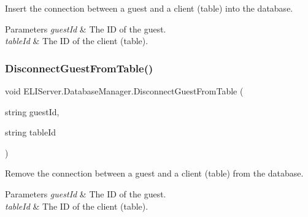 Insert the connection between a guest and a client (table) into the database. 


\begin{DoxyParams}{Parameters}
{\em guest\+Id} & The ID of the guest.\\
\hline
{\em table\+Id} & The ID of the client (table).\\
\hline
\end{DoxyParams}
\mbox{\label{class_e_l_i_server_1_1_database_manager_a99034ff69cba06942d29a9ad444b04c3}} 
\subsubsection{\texorpdfstring{Disconnect\+Guest\+From\+Table()}{DisconnectGuestFromTable()}}
{\footnotesize\ttfamily void E\+L\+I\+Server.\+Database\+Manager.\+Disconnect\+Guest\+From\+Table (\begin{DoxyParamCaption}\item[{string}]{guest\+Id,  }\item[{string}]{table\+Id }\end{DoxyParamCaption})\hspace{0.3cm}{\ttfamily [inline]}}



Remove the connection between a guest and a client (table) from the database. 


\begin{DoxyParams}{Parameters}
{\em guest\+Id} & The ID of the guest.\\
\hline
{\em table\+Id} & The ID of the client (table).\\
\hline
\end{DoxyParams}
\mbox{\label{class_e_l_i_server_1_1_database_manager_a85c00dfc07b07c4840aca4fcdd09175e}} 
